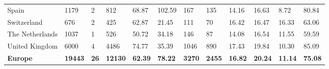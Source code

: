 \begin{tabular}{llllllllllll}
  Spain & 1179 & 2 & 812 & 68.87 & 102.59 & 167 & 135 & 14.16 & 16.63 & 8.72 & 80.84 \\ 
  Switzerland & 676 & 2 & 425 & 62.87 & 21.45 & 111 & 70 & 16.42 & 16.47 & 16.33 & 63.06 \\ 
  The Netherlands & 1037 & 1 & 526 & 50.72 & 34.18 & 146 & 87 & 14.08 & 16.54 & 11.55 & 59.59 \\ 
  United Kingdom & 6000 & 4 & 4486 & 74.77 & 35.39 & 1046 & 890 & 17.43 & 19.84 & 10.30 & 85.09 \\ 
  \textbf{Europe} & \textbf{19443} & \textbf{26} & \textbf{12130} & \textbf{62.39} & \textbf{78.22} & \textbf{3270} & \textbf{2455} & \textbf{16.82} & \textbf{20.24} & \textbf{11.14} & \textbf{75.08} \\ 
   \bottomrule
\end{tabular}

